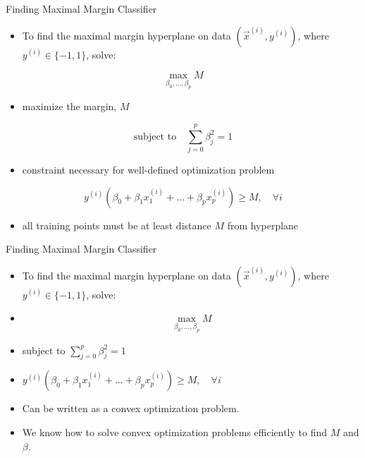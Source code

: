 \begin{frame}{Finding Maximal Margin Classifier}
\begin{itemize}
  \item To find the maximal margin hyperplane on data $(\vec{x}^{(i)}, y^{(i)})$, where $y^{(i)} \in \{-1, 1\}$, solve:
\end{itemize}

\[
\max_{\beta_0, \ldots, \beta_p} M
\]

\begin{itemize}
  \item maximize the margin, $M$
\end{itemize}

\[
\text{subject to} \quad \sum_{j=0}^{p} \beta_j^2 = 1
\]

\begin{itemize}
  \item constraint necessary for well-defined optimization problem
\end{itemize}

\[
y^{(i)}\left( \beta_0 + \beta_1 x_1^{(i)} + \ldots + \beta_p x_p^{(i)} \right) \geq M, \quad \forall i
\]

\begin{itemize}
  \item all training points must be at least distance $M$ from hyperplane
\end{itemize}
\end{frame}

\begin{frame}{Finding Maximal Margin Classifier}
\begin{itemize}
  \item To find the maximal margin hyperplane on data $(\vec{x}^{(i)}, y^{(i)})$, where $y^{(i)} \in \{-1, 1\}$, solve:
\end{itemize}
\begin{itemize}
    \item \[ \max_{\beta_0, \ldots, \beta_p} M \]
\end{itemize}

\begin{itemize}
  \item subject to $\sum_{j=0}^{p} \beta_j^2 = 1$
  \item $y^{(i)}\left( \beta_0 + \beta_1 x_1^{(i)} + \ldots + \beta_p x_p^{(i)} \right) \geq M, \quad \forall i$
\end{itemize}

\begin{itemize}
  \item Can be written as a convex optimization problem.
  \item We know how to solve convex optimization problems efficiently to find $M$ and $\beta$.
\end{itemize}
\end{frame}



